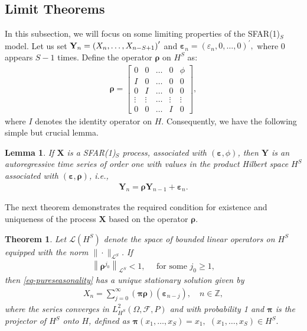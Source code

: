 \documentclass[11pt,a4paper]{article}
\newtheorem{lemma} {Lemma}[section]
\newtheorem{Theorem} {Theorem}[section]
\numberwithin{equation}{section}
\begin{document}
\subsection{Limit Theorems}

In this subsection, we will focus on some limiting properties of the SFAR(1)$_S$ model. Let us set ${\bf{Y}}_{n}=\left(X_{n},\dots,X_{n-S+1}\right)^{\prime}$ and $\bm{\varepsilon}_{n}=\left(\varepsilon_{n},0,\dots,0\right)^{\prime},$ where 0 appears $S-1$ times. Define the operator $\bm{\rho}$ on $H^{S}$ as:
\begin{align}
  \bm{\rho} =
    \begin{bmatrix}
      0      & 0      & \dots & 0      & \phi \\
      I      & 0      & \dots & 0      & 0 \\
      0      & I      & \dots & 0      & 0 \\
      \vdots & \vdots & \dots & \vdots & \vdots \\
      0      & 0      & \dots & I      & 0
    \end{bmatrix},
\end{align}
where $I$ denotes the identity operator on $H$. Consequently, we have the following simple but crucial lemma.

\begin{lemma}
  If $\bm{X}$ is a SFAR(1)$_S$ process, associated with $(\bm{\varepsilon},\phi)$, then $\bm{Y}$ is an autoregressive time series of order one with values in the product Hilbert space $H^S$ associated with $\left(\bm{\varepsilon},\bm{\rho}\right)$, i.e.,
  \begin{align}
    \bm{Y}_n=\bm{\rho}\bm{Y}_{n-1}+\bm{\varepsilon}_n.
  \end{align}
\end{lemma}
The next theorem demonstrates the required condition for  existence and uniqueness of the process $\bm{X}$ based on the operator $\bm{\rho}$.

\begin{Theorem}
  Let $\mathcal{L}\left(H^S\right)$ denote the space of bounded linear operators on $H^S$ equipped with the norm $\|\cdot\|_{\mathcal{L}^S}$. If
  \begin{align}\label{eq-cond1}
    \left\|\bm{\rho}^{j_{0}}\right\|_{\mathcal{L}^S}<1,
    \quad{\text{ for some }} j_{0}\geq 1,
  \end{align}
  then \eqref{eq-pureseasonality} has a unique stationary solution given by
  \begin{align} X_n=\sum_{j=0}^\infty
    \left(\bm{\pi}\bm{\rho}\right)\left(\bm{\varepsilon}_{n-j}\right),
    \quad n\in {\mathbb{Z}},
  \end{align}
  where the series converges in $L^2_{H^S}(\Omega,\mathcal{F},P)$ and with probability 1 and $\bm{\pi}$ is the projector of $H^S$ onto $H$, defined as $\bm{\pi}\left(x_1,\dots,x_S\right)=x_1,$ $\left(x_1,\dots,x_S\right)\in H^S.$
\end{Theorem}
\end{document}
